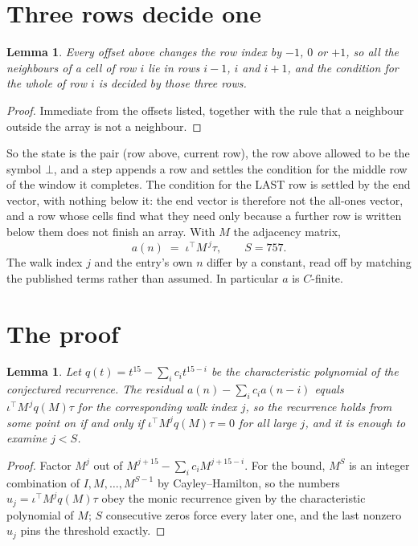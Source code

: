 \documentclass[11pt,a4paper]{article}
\theoremstyle{plain}
\newtheorem{lemma}[theorem]{Lemma}
\theoremstyle{definition}
\begin{document}
\section{Three rows decide one}

\begin{lemma}\label{lem:win}
Every offset above changes the row index by $-1$, $0$ or $+1$, so all the neighbours of a cell
of row $i$ lie in rows $i-1$, $i$ and $i+1$, and the condition for the whole of row $i$ is
decided by those three rows.
\end{lemma}

\begin{proof}
Immediate from the offsets listed, together with the rule that a neighbour outside the array is
not a neighbour.
\end{proof}

So the state is the pair (row above, current row), the row above allowed to be the symbol
$\bot$, and a step appends a row and settles the condition for the middle row of the window it
completes. The condition for the LAST row is settled by the end vector, with nothing below it:
the end vector is therefore not the all-ones vector, and a row whose cells find what they need
only because a further row is written below them does not finish an array. With $M$ the
adjacency matrix,
\[
a(n)\;=\;\iota^{\!\top}M^{\,j}\tau ,\qquad S=757.
\]
The walk index $j$ and the entry's own $n$ differ by a constant, read off by matching the
published terms rather than assumed. In particular $a$ is $C$-finite.

\section{The proof}

\begin{lemma}\label{lem:crit}
Let $q(t)=t^{15}-\sum_i c_it^{15-i}$ be the characteristic polynomial of the
conjectured recurrence. The residual $a(n)-\sum_ic_ia(n-i)$ equals
$\iota^{\!\top}M^{\,j}q(M)\tau$ for the corresponding walk index $j$, so the recurrence
holds from some point on if and only if $\iota^{\!\top}M^{j}q(M)\tau=0$ for all large $j$,
and it is enough to examine $j<S$.
\end{lemma}

\begin{proof}
Factor $M^{j}$ out of $M^{j+15}-\sum_ic_iM^{j+15-i}$. For the bound, $M^{S}$
is an integer combination of $I,M,\dots,M^{S-1}$ by Cayley--Hamilton, so the numbers
$u_j=\iota^{\!\top}M^{j}q(M)\tau$ obey the monic recurrence given by the characteristic
polynomial of $M$; $S$ consecutive zeros force every later one, and the last nonzero $u_j$
pins the threshold exactly.
\end{proof}
\end{document}

